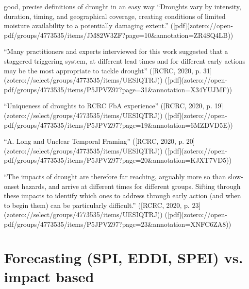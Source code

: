 {good, precise definitions of drought in an easy way
“Droughts vary by intensity, duration, timing, and geographical coverage, creating conditions of limited moisture availability to a potentially damaging extent.” ([pdf](zotero://open-pdf/groups/4773535/items/JM82W3ZF?page=10&annotation=ZR4SQ4LB))

“Many practitioners and experts interviewed for this work suggested that a staggered triggering system, at different lead times and for different early actions may be the most appropriate to tackle drought” ([RCRC, 2020, p. 31](zotero://select/groups/4773535/items/UESIQTRJ)) ([pdf](zotero://open-pdf/groups/4773535/items/P5JPVZ97?page=31&annotation=X34YUJMF))


“Uniqueness of droughts to RCRC FbA experience” ([RCRC, 2020, p. 19](zotero://select/groups/4773535/items/UESIQTRJ)) ([pdf](zotero://open-pdf/groups/4773535/items/P5JPVZ97?page=19&annotation=6MZDVD5E))

“A. Long and Unclear Temporal Framing” ([RCRC, 2020, p. 20](zotero://select/groups/4773535/items/UESIQTRJ)) ([pdf](zotero://open-pdf/groups/4773535/items/P5JPVZ97?page=20&annotation=KJXT7VD5))

“The impacts of drought are therefore far reaching, arguably more so than slow-onset hazards, and arrive at different times for different groups. Sifting through these impacts to identify which ones to address through early action (and when to begin them) can be particularly difficult.” ([RCRC, 2020, p. 23](zotero://select/groups/4773535/items/UESIQTRJ)) ([pdf](zotero://open-pdf/groups/4773535/items/P5JPVZ97?page=23&annotation=XNFC6ZA8))



\section{Forecasting (SPI, EDDI, SPEI) vs. impact based}



}
